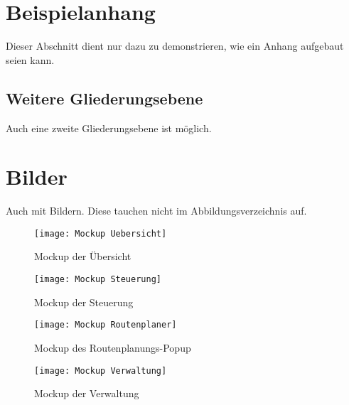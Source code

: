 \section{Beispielanhang}\label{Beispielanhang}
Dieser Abschnitt dient nur dazu zu demonstrieren, wie ein Anhang aufgebaut seien kann.
\subsection{Weitere Gliederungsebene}
Auch eine zweite Gliederungsebene ist möglich.
\section{Bilder}
Auch mit Bildern.
Diese tauchen nicht im Abbildungsverzeichnis auf.
\begin{figure}[H]
    \centering
    \caption[]{Mockup der Übersicht}\label{fig:MockupOverview}
    \texttt{[image: Mockup Uebersicht]}
\end{figure}

\begin{figure}[H]
    \centering
    \caption[]{Mockup der Steuerung}\label{fig:MockupControls}
    \texttt{[image: Mockup Steuerung]}
\end{figure}

\begin{figure}[H]
    \centering
    \caption[]{Mockup des Routenplanungs-Popup}\label{fig:MockupRoutePlanner}
    \texttt{[image: Mockup Routenplaner]}
\end{figure}

\begin{figure}[H]
    \centering
    \caption[]{Mockup der Verwaltung}\label{fig:MockupAdministration}
    \texttt{[image: Mockup Verwaltung]}
\end{figure}